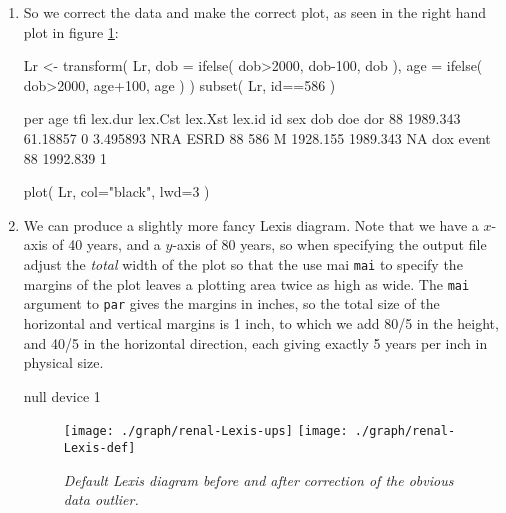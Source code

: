 \begin{enumerate}
\item So we correct the data and make the correct plot, as seen in the right
   hand plot in figure \ref{fig:Lexis-ups}:
\begin{Schunk}
\begin{Sinput}
 Lr <- transform( Lr, dob = ifelse( dob>2000, dob-100, dob ),
                      age = ifelse( dob>2000, age+100, age ) )
 subset( Lr, id==586 )
\end{Sinput}
\begin{Soutput}
        per      age tfi  lex.dur lex.Cst lex.Xst lex.id  id sex      dob      doe dor
88 1989.343 61.18857   0 3.495893     NRA    ESRD     88 586   M 1928.155 1989.343  NA
        dox event
88 1992.839     1
\end{Soutput}
\begin{Sinput}
 plot( Lr, col="black", lwd=3 )
\end{Sinput}
\end{Schunk}


\item We can produce a slightly more fancy Lexis diagram. Note that we
  have a $x$-axis of 40 years, and a $y$-axis of 80 years, so when
  specifying the output file adjust the \emph{total} width of the plot
  so that the use mai \texttt{mai} to specify the margins of the plot
  leaves a plotting area twice as high as wide. The \texttt{mai}
  argument to \texttt{par} gives the margins in inches, so the total
  size of the horizontal and vertical margins is 1 inch, to which we
  add 80/5 in the height, and 40/5 in the horizontal direction, each
  giving exactly 5 years per inch in physical size.
\begin{Schunk}
\begin{Soutput}
null device 
          1 
\end{Soutput}
\end{Schunk}
\begin{figure}[tb]
  \centering
  \texttt{[image: ./graph/renal-Lexis-ups]}
  \texttt{[image: ./graph/renal-Lexis-def]}
  \caption{\it Default Lexis diagram before and after correction of
    the obvious data outlier.}
  \label{fig:Lexis-ups}
\end{figure}


\end{enumerate}

